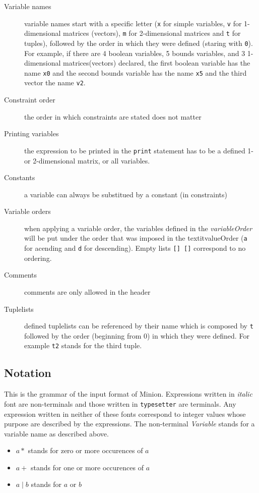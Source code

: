 \documentclass{article}
\begin{document}
\begin{small}
\begin{description}
  \item[Variable names]  variable names start with a specific letter 
  (\texttt{x} for simple variables, \texttt{v} for 1-dimensional matrices
  (vectors), \texttt{m} for 2-dimensional matrices and \texttt{t} for
  tuples), followed by the order in which they were defined  (staring with \texttt{0}). 
  For example, if there are 4 boolean variables, 5 bounds variables,
  and 3 1-dimensional matrices(vectors) declared, 
  the first boolean variable has the name \texttt{x0} and the second
  bounds variable has the name \texttt{x5} and the third vector the
  name \texttt{v2}.  
  \item[Constraint order] the order in which constraints are stated does not matter
  \item[Printing variables] the expression to be printed in the \texttt{print} statement
  has to be a defined 1- or 2-dimensional matrix, or all variables.
  \item[Constants] a variable can always be substitued by a constant (in constraints)
  \item[Variable orders] when applying a variable order, the variables defined in the
  \textit{variableOrder} will be put under the order  that was imposed in the
  textit{valueOrder} (\texttt{a} for acending
  and \texttt{d} for descending). Empty lists \texttt{[] []} correspond to no ordering.
  \item[Comments] comments are only allowed in the header
  \item[Tuplelists] defined tuplelists can be referenced by their name which is
  composed by \texttt{t} followed by the order (beginning from 0) in which they were
  defined. For example \texttt{t2} stands for the third tuple.  
\end{description}



\subsection{Notation}

This is the grammar of the input format of Minion. Expressions written
in \textit{italic} font are non-terminals and those written in 
\texttt{typesetter} are terminals. Any expression written in neither
of these fonts correspond to integer values whose purpose are
described by the expressions. The non-terminal \textit{Variable} stands for a 
variable name as described above.

 
\begin{center}
\begin{itemize}
  \item $a *$ stands for zero or more occurences of $a$
  \item $a +$ stands for one or more occurences of $a$
  \item $a \mid b$ stands for $a$ or $b$


\end{itemize}
\end{center}
\end{small}
\end{document}
